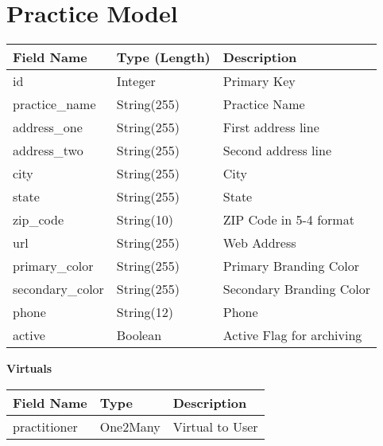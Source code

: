 \documentclass[letterpaper,10pt,english]{sphinxmanual}
\begin{document}
\section{Practice Model}
\label{dev-models:practice-model-label}\label{dev-models:practice-model}
\begin{tabulary}{\linewidth}{|L|L|L|}
\hline
\textsf{\relax 
Field Name
} & \textsf{\relax 
Type (Length)
} & \textsf{\relax 
Description
}\\
\hline
id
 & 
Integer
 & 
Primary Key
\\

practice\_name
 & 
String(255)
 & 
Practice Name
\\

address\_one
 & 
String(255)
 & 
First address line
\\

address\_two
 & 
String(255)
 & 
Second address line
\\

city
 & 
String(255)
 & 
City
\\

state
 & 
String(255)
 & 
State
\\

zip\_code
 & 
String(10)
 & 
ZIP Code in 5-4 format
\\

url
 & 
String(255)
 & 
Web Address
\\

primary\_color
 & 
String(255)
 & 
Primary Branding Color
\\

secondary\_color
 & 
String(255)
 & 
Secondary Branding Color
\\

phone
 & 
String(12)
 & 
Phone
\\

active
 & 
Boolean
 & 
Active Flag for archiving
\\
\hline\end{tabulary}


\textbf{Virtuals}

\begin{tabulary}{\linewidth}{|L|L|L|}
\hline
\textsf{\relax 
Field Name
} & \textsf{\relax 
Type
} & \textsf{\relax 
Description
}\\
\hline
practitioner
 & 
One2Many
 & 
Virtual to User
\\
\hline\end{tabulary}
\end{document}
